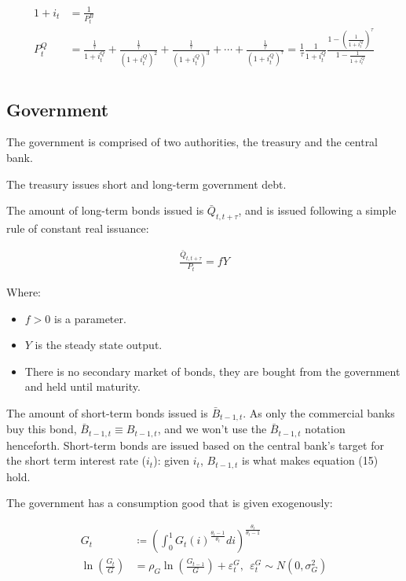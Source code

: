 \documentclass[12pt]{article}
\begin{document}
\begin{align*}
    1 + i_t &= \frac{1}{P^B_t} \tag{15}\\
    P_{t}^{Q} &= \frac{\frac{1}{\tau}}{1+i_{t}^{Q}}+\frac{\frac{1}{\tau}}{\left(1+i_{t}^{Q}\right)^{2}}+\frac{\frac{1}{\tau}}{\left(1+i_{t}^{Q}\right)^{3}}+\cdots+\frac{\frac{1}{\tau}}{\left(1+i_{t}^{Q}\right)^{\tau}}=\frac{1}{\tau}\frac{1}{1+i_{t}^{Q}}\frac{1-\left(\frac{1}{1+i_{t}^{Q}}\right)^{\tau}}{1-\frac{1}{1+i_{t}^{Q}}} \tag{16}\\
\end{align*}



\subsection{Government}

The government is comprised of two authorities, the treasury and the central bank.

The treasury issues short and long-term government debt.

The amount of long-term bonds issued is $\bar Q_{t,t+\tau}$, and is issued following a simple rule of constant real issuance:

\begin{align*}
    \frac{\bar Q_{t,t+\tau}}{P_t} = fY \tag{17}
\end{align*}

Where:

\begin{itemize}
    \item $f > 0$ is a parameter.
    \item $Y$ is the steady state output.
    \item There is no secondary market of bonds, they are bought from the government and held until maturity.
\end{itemize}

The amount of short-term bonds issued is $\bar B_{t-1,t}$. As only the commercial banks buy this bond, $\bar B_{t-1,t} \equiv B_{t-1,t}$, and we won't use the $\bar B_{t-1,t}$ notation henceforth. Short-term bonds are issued based on the central bank's target for the short term interest rate ($i_t$): given $i_t$, $B_{t-1,t}$ is what makes equation (15) hold.

The government has a consumption good that is given exogenously:

\begin{align*}
    G_t &\coloneqq \left(\int_0^1G_t(i)^{\frac{\theta_t - 1}{\theta_t}} di\right)^{\frac{\theta_t}{\theta_t - 1}}\\
    \ln \left(\frac{G_t}{G}\right) &= \rho_G \ln \left(\frac{G_{t-1}}{G}\right) + \varepsilon_t^G, ~~ \varepsilon_t^G \sim N(0, \sigma^2_G)\tag{18}
\end{align*}
\end{document}
